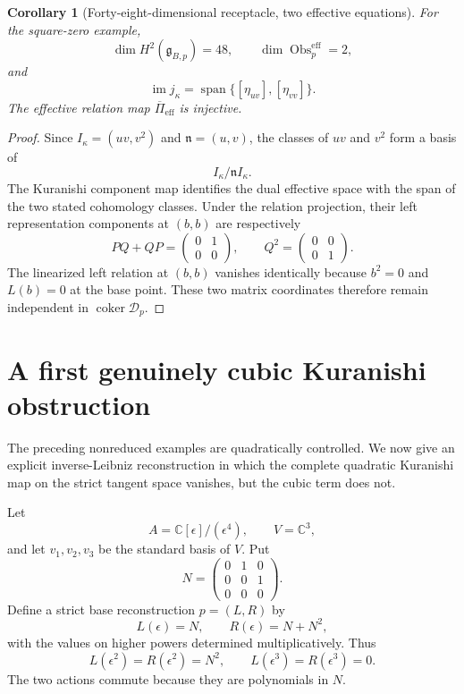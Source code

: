 \documentclass[11pt]{amsart}
\newtheorem{corollary}[theorem]{Corollary}
\newcommand{\Span}{\operatorname{span}}
\newcommand{\coker}{\operatorname{coker}}
\newcommand{\Obs}{\operatorname{Obs}}
\newcommand{\cD}{\mathscr D}
\newcommand{\C}{\mathbb C}
\newcommand{\ghoch}{\mathfrak g}
\begin{document}
\begin{corollary}[Forty-eight-dimensional receptacle, two effective equations]\label{cor:two-parameter-effective}
For the square-zero example,
\[
\dim H^2(\ghoch_{B,p})=48,
\qquad
\dim\Obs^{\mathrm{eff}}_p=2,
\]
and
\[
\operatorname{im}j_\kappa
=
\Span\{[\eta_{uv}],[\eta_{vv}]\}.
\]
The effective relation map $\overline\Pi_{\mathrm{eff}}$ is injective.
\end{corollary}

\begin{proof}
Since $I_\kappa=(uv,v^2)$ and $\mathfrak n=(u,v)$, the classes of $uv$ and $v^2$ form a basis of
\[
I_\kappa/\mathfrak nI_\kappa.
\]
The Kuranishi component map identifies the dual effective space with the span of the two stated cohomology classes.  Under the relation projection, their left representation components at $(b,b)$ are respectively
\[
PQ+QP=
\begin{pmatrix}0&1\\0&0\end{pmatrix},
\qquad
Q^2=
\begin{pmatrix}0&0\\0&1\end{pmatrix}.
\]
The linearized left relation at $(b,b)$ vanishes identically because $b^2=0$ and $L(b)=0$ at the base point.  These two matrix coordinates therefore remain independent in $\coker\cD_p$.
\end{proof}


\section{A first genuinely cubic Kuranishi obstruction}\label{sec:cubic-example}

The preceding nonreduced examples are quadratically controlled.  We now give an explicit inverse-Leibniz reconstruction in which the complete quadratic Kuranishi map on the strict tangent space vanishes, but the cubic term does not.

Let
\[
A=\C[\epsilon]/(\epsilon^4),
\qquad
V=\C^3,
\]
and let $v_1,v_2,v_3$ be the standard basis of $V$.  Put
\[
N=
\begin{pmatrix}
0&1&0\\
0&0&1\\
0&0&0
\end{pmatrix}.
\]
Define a strict base reconstruction $p=(L,R)$ by
\[
L(\epsilon)=N,
\qquad
R(\epsilon)=N+N^2,
\]
with the values on higher powers determined multiplicatively.  Thus
\[
L(\epsilon^2)=R(\epsilon^2)=N^2,
\qquad
L(\epsilon^3)=R(\epsilon^3)=0.
\]
The two actions commute because they are polynomials in $N$.
\end{document}
